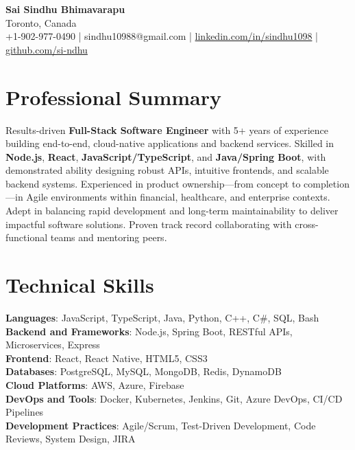 \documentclass[letterpaper,11pt]{article}
\begin{document}
\begin{center}
  {\Large \textbf{Sai Sindhu Bhimavarapu}} \\
  Toronto, Canada \\
  +1-902-977-0490 \enspace | \enspace sindhu10988@gmail.com \enspace | \enspace \href{https://www.linkedin.com/in/sindhu1098/}{linkedin.com/in/sindhu1098} \enspace | \enspace \href{https://github.com/si-ndhu}{github.com/si-ndhu}
\end{center}

\section{Professional Summary}
  \begin{itemize}[leftmargin=0.15in, label={}]
    \small{\item{
     Results-driven \textbf{Full-Stack Software Engineer} with 5+ years of experience building end-to-end, cloud-native applications and backend services. Skilled in \textbf{Node.js}, \textbf{React}, \textbf{JavaScript/TypeScript}, and \textbf{Java/Spring Boot}, with demonstrated ability designing robust APIs, intuitive frontends, and scalable backend systems. Experienced in product ownership—from concept to completion—in Agile environments within financial, healthcare, and enterprise contexts. Adept in balancing rapid development and long-term maintainability to deliver impactful software solutions. Proven track record collaborating with cross-functional teams and mentoring peers.
    }}
  \end{itemize}
\vspace{-16pt}

\section{Technical Skills}
 \begin{itemize}[leftmargin=0.15in, label={}]
    \small{\item{
     \textbf{Languages}: JavaScript, TypeScript, Java, Python, C++, C\#, SQL, Bash \\
     \textbf{Backend and Frameworks}: Node.js, Spring Boot, RESTful APIs, Microservices, Express \\
     \textbf{Frontend}: React, React Native, HTML5, CSS3 \\
     \textbf{Databases}: PostgreSQL, MySQL, MongoDB, Redis, DynamoDB \\
     \textbf{Cloud Platforms}: AWS, Azure, Firebase \\
     \textbf{DevOps and Tools}: Docker, Kubernetes, Jenkins, Git, Azure DevOps, CI/CD Pipelines \\
     \textbf{Development Practices}: Agile/Scrum, Test-Driven Development, Code Reviews, System Design, JIRA
    }}
 \end{itemize}
\vspace{-16pt}
\end{document}

